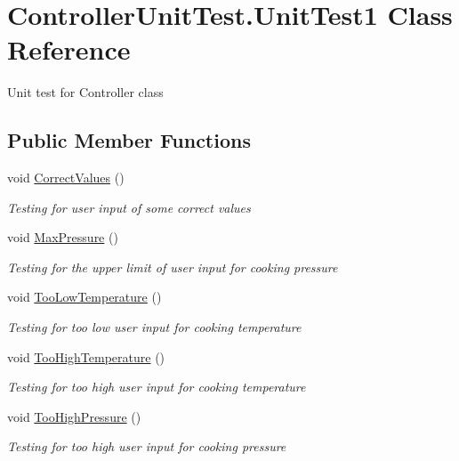 \hypertarget{class_controller_unit_test_1_1_unit_test1}{}\section{Controller\+Unit\+Test.\+Unit\+Test1 Class Reference}
\label{class_controller_unit_test_1_1_unit_test1}


Unit test for Controller class  


\subsection*{Public Member Functions}
\begin{DoxyCompactItemize}
\item 
void \hyperlink{class_controller_unit_test_1_1_unit_test1_ab5f5063ecc6c61fcddd18f3ef6694868}{Correct\+Values} ()
\begin{DoxyCompactList}\small\item\em Testing for user input of some correct values \end{DoxyCompactList}\item 
void \hyperlink{class_controller_unit_test_1_1_unit_test1_a1191a8c6fa2b4ff8b6293cc5a2680c19}{Max\+Pressure} ()
\begin{DoxyCompactList}\small\item\em Testing for the upper limit of user input for cooking pressure \end{DoxyCompactList}\item 
void \hyperlink{class_controller_unit_test_1_1_unit_test1_a7bdcd66725dc66a60616781b47d4cf11}{Too\+Low\+Temperature} ()
\begin{DoxyCompactList}\small\item\em Testing for too low user input for cooking temperature \end{DoxyCompactList}\item 
void \hyperlink{class_controller_unit_test_1_1_unit_test1_ad6301b75ca38599999e9c20b65731595}{Too\+High\+Temperature} ()
\begin{DoxyCompactList}\small\item\em Testing for too high user input for cooking temperature \end{DoxyCompactList}\item 
void \hyperlink{class_controller_unit_test_1_1_unit_test1_a489508b562944eaddd888034be0b66dc}{Too\+High\+Pressure} ()
\begin{DoxyCompactList}\small\item\em Testing for too high user input for cooking pressure \end{DoxyCompactList}\item 

\end{DoxyCompactItemize}
